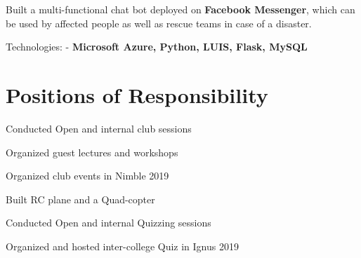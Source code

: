 \documentclass[]{deedy-resume-openfont}
\begin{document}
\begin{minipage}[t]{0.66\textwidth}

\begin{tightemize}
\item Built a multi-functional chat bot deployed on \textbf{Facebook Messenger}, which can be used by affected people as well as rescue teams in case of a disaster.
\item 
Technologies: - \textbf{Microsoft Azure, Python, LUIS, Flask, MySQL}
\end{tightemize}
\sectionsep




\section{Positions of Responsibility} 

\begin{tightemize}
\item Conducted Open and internal club sessions
\item Organized guest lectures and workshops
\item Organized club events in Nimble 2019
\item Built RC plane and a Quad-copter
\end{tightemize}

\begin{tightemize}
\item Conducted Open and internal Quizzing sessions
\item Organized and hosted inter-college Quiz in Ignus 2019 
\end{tightemize}


\end{minipage}
\end{document}
